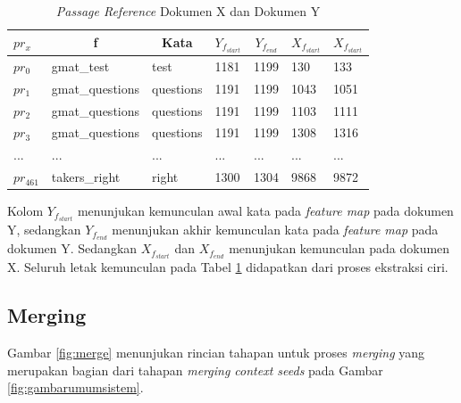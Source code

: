 \documentclass[../Book.tex]{subfiles}
\begin{document}
	\begin{table}[H]
		\centering
		\caption{\textit{Passage Reference} Dokumen X dan Dokumen Y}
		\label{seedset}
		\begin{tabular}{@{}lllllll@{}}
			\toprule
			$pr_{x}$ & \multicolumn{1}{c}{f} & \multicolumn{1}{c}{Kata} & \multicolumn{1}{c}{$Y_{f_{start}}$} & \multicolumn{1}{c}{$Y_{f_{end}}$} & \multicolumn{1}{c}{$X_{f_{start}}$} & \multicolumn{1}{c}{$X_{f_{start}}$} \\ \midrule
			$pr_{0}$ & gmat\_test       		& test                   	& 1181                    	& 1199                    	& 130                   & 133	\\
			$pr_{1}$ & gmat\_questions       	& questions             	& 1191	                    & 1199                    	& 1043                  & 1051	\\
			$pr_{2}$ & gmat\_questions       	& questions                 & 1191  	               	& 1199                    	& 1103                  & 1111	\\
			$pr_{3}$ & gmat\_questions		 	& questions					& 1191						& 1199						& 1308					& 1316 	\\
 			...		 & ...                   	& ...                      	& ...                   	& ...                   	& ...                   & ...	\\
			$pr_{461}$ 	& takers\_right         & right                   	& 1300                   	& 1304                   	& 9868                 & 9872          \\ \bottomrule         
		\end{tabular}
	\end{table}
	
	Kolom $Y_{f_{start}}$ menunjukan kemunculan awal kata pada \textit{feature map} pada dokumen Y, sedangkan $Y_{f_{end}}$ menunjukan akhir kemunculan kata pada \textit{feature map} pada dokumen Y. Sedangkan $X_{f_{start}}$ dan $X_{f_{end}}$ menunjukan kemunculan pada dokumen X. Seluruh letak kemunculan pada Tabel \ref{seedset} didapatkan dari proses ekstraksi ciri.
	
	\subsection{Merging}
	
	\noindent Gambar \ref{fig:merge} menunjukan rincian tahapan untuk proses \textit{merging} yang merupakan bagian dari tahapan \textit{merging context seeds} pada Gambar \ref{fig:gambarumumsistem}.
	
\end{document}
